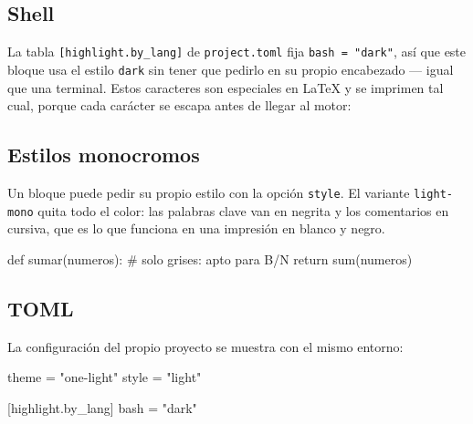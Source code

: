 \subsection{Shell}

La tabla \texttt{[highlight.by\_lang]} de \texttt{project.toml} fija
\texttt{bash = "dark"}, así que este bloque usa el estilo \texttt{dark} sin
tener que pedirlo en su propio encabezado --- igual que una terminal. Estos
caracteres son especiales en LaTeX y se imprimen tal cual, porque cada
carácter se escapa antes de llegar al motor:


\subsection{Estilos monocromos}

Un bloque puede pedir su propio estilo con la opción \texttt{style}. El
variante \texttt{light-mono} quita todo el color: las palabras clave van en
negrita y los comentarios en cursiva, que es lo que funciona en una
impresión en blanco y negro.

\begin{code}[lang=python, style=light-mono]
def sumar(numeros):  # solo grises: apto para B/N
    return sum(numeros)
\end{code}

\subsection{TOML}

La configuración del propio proyecto se muestra con el mismo entorno:

\begin{code}[lang=toml]
[highlight]
theme = "one-light"
style = "light"

[highlight.by_lang]
bash = "dark"
\end{code}

\listoflistings
